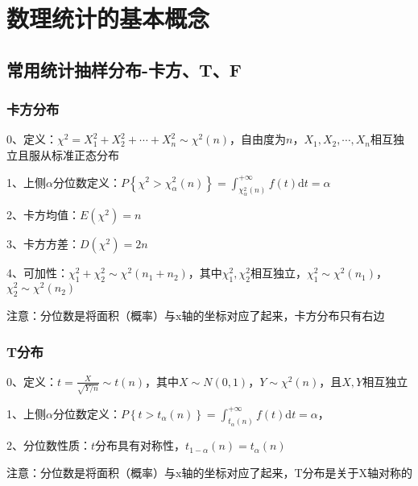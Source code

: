 \chapter{数理统计的基本概念}

\section{常用统计抽样分布-卡方、T、F}



\subsection{卡方分布}

0、定义：$\chi^{2} = X_1^2+X_2^2+\cdots+X_n^2 \sim \chi^{2}(n)$，自由度为$n$，$X_1,X_2,\cdots ,X_n$相互独立且服从标准正态分布

1、上侧$\alpha$分位数定义：$P\left\{\chi^{2}>\chi_{\alpha}^{2}(n)\right\}=\int_{\chi_{\alpha}^{2}(n)}^{+\infty} f(t) \mathrm{d} t=\alpha$

2、卡方均值：$E\left(\chi^{2}\right)=n$

3、卡方方差：$D\left(\chi^{2}\right)=2 n$

4、可加性：$\chi_{1}^{2}+\chi_{2}^{2} \sim \chi^{2}\left(n_{1}+n_{2}\right)$，其中$\chi_{1}^{2}, \chi_{2}^{2}$相互独立，$\chi_{1}^{2} \sim \chi^{2}\left(n_{1}\right)$，$\chi_{2}^{2} \sim \chi^{2}\left(n_{2}\right)$

注意：分位数是将面积（概率）与x轴的坐标对应了起来，卡方分布只有右边



\subsection{T分布}

0、定义：$t=\frac{X}{\sqrt{Y/n}} \sim t(n)$，其中$X \sim N(0,1)$，$Y\sim \chi^{2}\left(n\right)$，且$X,Y$相互独立

1、上侧$\alpha$分位数定义：$P\left\{t>t_{\alpha}(n)\right\}=\int_{t_{\alpha}(n)}^{+\infty} f(t) \mathrm{d} t=\alpha$，

2、分位数性质：$t$分布具有对称性，$t_{1-\alpha}(n)=t_{\alpha}(n)$

注意：分位数是将面积（概率）与x轴的坐标对应了起来，T分布是关于X轴对称的



